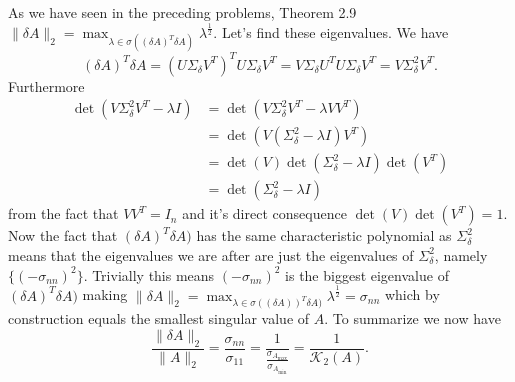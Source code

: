 As we have seen in the preceding problems, Theorem 2.9 $\| \delta A\|_2=\max_{\lambda\in\sigma((\delta A)^T\delta A)}\lambda^{\frac{1}{2}}$. Let's find these eigenvalues. We have
  $$ (\delta A)^T\delta A = \left(U\Sigma_{\delta}V^T\right)^TU\Sigma_{\delta}V^T = V\Sigma_{\delta}U^TU\Sigma_{\delta}V^T = V\Sigma_{\delta}^{2}V^T. $$
Furthermore
  \begin{align*}
     \operatorname{det}(V\Sigma_{\delta}^{2}V^T - \lambda I) & = \operatorname{det}(V\Sigma_{\delta}^{2}V^T - \lambda VV^T) \\
     & = \operatorname{det}(V(\Sigma_{\delta}^{2}-\lambda I)V^T) \\
  & = \operatorname{det}(V)\operatorname{det}(\Sigma_{\delta}^{2}-\lambda I)\operatorname{det}(V^T) \\
  & = \operatorname{det}(\Sigma_{\delta}^{2}-\lambda I)
 \end{align*}
  from the fact that $VV^T=I_n$ and it's direct consequence $\operatorname{det}(V)\operatorname{det}(V^T)=1$. Now the fact that $(\delta A)^T\delta A)$ has the same characteristic polynomial as $\Sigma_{\delta}^{2}$ means that the eigenvalues we are after are just the eigenvalues of $\Sigma_{\delta}^{2}$, namely $\{ (-\sigma_{nn})^{2} \}$. Trivially this means $(-\sigma_{nn})^{2}$ is the biggest eigenvalue of $(\delta A)^T\delta A)$
  making $\| \delta A\|_2=\max_{\lambda\in\sigma((\delta A))^T\delta A)}\lambda^{\frac{1}{2}}=\sigma_{nn}$ which by construction equals the smallest singular value of $A$. To summarize we now have
    $$ \frac{\| \delta A\|_2}{\|A\|_2} = \frac{\sigma_{nn}}{\sigma_{11}} = \frac{1}{\frac{\sigma_{A_{\max}}}{\sigma_{A_{\min}}}} = \frac{1}{\mathcal{K}_2(A)}. $$

